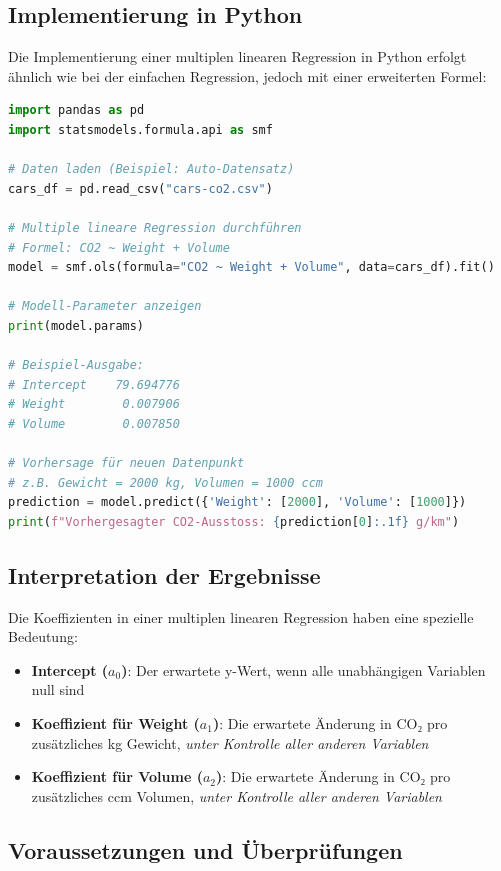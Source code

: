 \subsection{Implementierung in Python}

Die Implementierung einer multiplen linearen Regression in Python erfolgt ähnlich wie bei der einfachen Regression, jedoch mit einer erweiterten Formel:

\begin{lstlisting}[language=Python]
import pandas as pd
import statsmodels.formula.api as smf

# Daten laden (Beispiel: Auto-Datensatz)
cars_df = pd.read_csv("cars-co2.csv")

# Multiple lineare Regression durchführen
# Formel: CO2 ~ Weight + Volume
model = smf.ols(formula="CO2 ~ Weight + Volume", data=cars_df).fit()

# Modell-Parameter anzeigen
print(model.params)

# Beispiel-Ausgabe:
# Intercept    79.694776
# Weight        0.007906
# Volume        0.007850

# Vorhersage für neuen Datenpunkt
# z.B. Gewicht = 2000 kg, Volumen = 1000 ccm
prediction = model.predict({'Weight': [2000], 'Volume': [1000]})
print(f"Vorhergesagter CO2-Ausstoss: {prediction[0]:.1f} g/km")
\end{lstlisting}

\subsection{Interpretation der Ergebnisse}

Die Koeffizienten in einer multiplen linearen Regression haben eine spezielle Bedeutung:

\begin{itemize}
    \item \textbf{Intercept ($a_0$)}: Der erwartete y-Wert, wenn alle unabhängigen Variablen null sind
    \item \textbf{Koeffizient für Weight ($a_1$)}: Die erwartete Änderung in CO₂ pro zusätzliches kg Gewicht, \textit{unter Kontrolle aller anderen Variablen}
    \item \textbf{Koeffizient für Volume ($a_2$)}: Die erwartete Änderung in CO₂ pro zusätzliches ccm Volumen, \textit{unter Kontrolle aller anderen Variablen}
\end{itemize}

\subsection{Voraussetzungen und Überprüfungen}


